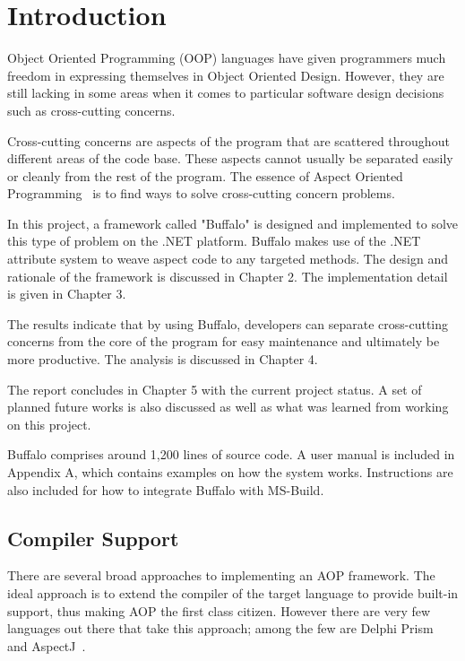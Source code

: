 \chapter{Introduction}

Object Oriented Programming (OOP) languages have given programmers much freedom in expressing themselves in Object Oriented Design. However, they are still lacking in some areas when it comes to particular software design decisions such as cross-cutting concerns.

Cross-cutting concerns are aspects of the program that are scattered throughout different areas of the code base. These aspects cannot usually be separated easily or cleanly from the rest of the program. The essence of Aspect Oriented Programming~\cite{aop} is to find ways to solve cross-cutting concern problems.

In this project, a framework called "Buffalo" is designed and implemented to solve this type of problem on the .NET platform. Buffalo makes use of the .NET attribute system to weave aspect code to any targeted methods. The design and rationale of the framework is discussed in Chapter 2. The implementation detail is given in Chapter 3.

The results indicate that by using Buffalo, developers can separate cross-cutting concerns from the core of the program for easy maintenance and ultimately be more productive. The analysis is discussed in Chapter 4.

The report concludes in Chapter 5 with the current project status. A set of planned future works is also discussed as well as what was learned from working on this project.

Buffalo comprises around 1,200 lines of source code. A user manual is included in Appendix A, which contains examples on how the system works. Instructions are also included for how to integrate Buffalo with MS-Build.


\section{Compiler Support}

There are several broad approaches to implementing an AOP framework. The ideal approach is to extend the compiler of the target language to provide built-in support, thus making AOP the first class citizen. However there are very few languages out there that take this approach; among the few are Delphi Prism~\cite{delphi_prism2010} and AspectJ~\cite{aspectj_faq, aspectj_text}. 

